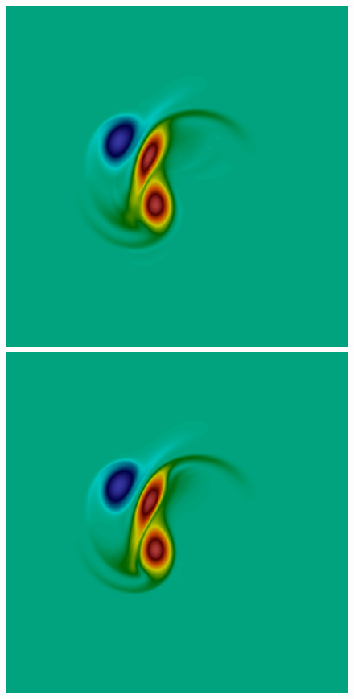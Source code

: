 \begin{figure}[t]
\includegraphics[scale=0.06]{data/Incompressible_Euler/Snapshots/red_17_3.png}\hspace{1em}
\includegraphics[scale=0.06]{data/Incompressible_Euler/Snapshots/red_35_3.png}\hspace{1em}

\end{figure}
